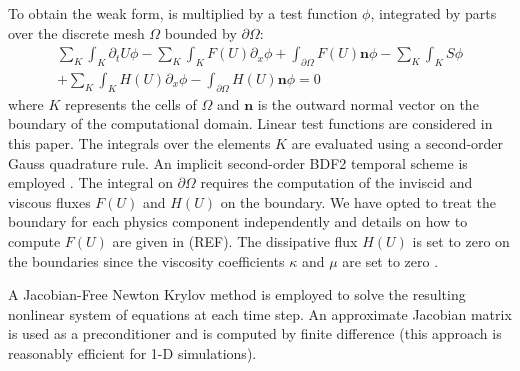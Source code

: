 \documentclass[times,doublespace]{fldauth}%
\begin{document}
%
To obtain the weak form,  is multiplied by a test function $\phi$, integrated by parts over the discrete mesh $\Omega$ bounded by $\partial \Omega$:
\begin{multline}
\sum_K \int_{K} \partial_t U \phi - \sum_K \int_{K} F(U) \partial_x \phi + \int_{\partial \Omega} F(U) \mathbf{n} \phi - 
 \sum_K \int_{K} S \phi \\
 + \sum_K \int_{K} H(U) \partial_x \phi - \int_{\partial \Omega}H \left( U \right) \mathbf{n} \phi= 0
\end{multline}
where $K$ represents the cells of $\Omega$ and $\mathbf{n}$ is the outward normal vector on the boundary of the computational domain. 
Linear test functions are considered in this paper. The integrals over the elements $K$ are evaluated using a second-order Gauss quadrature rule. 
An implicit second-order BDF2 temporal scheme is employed \cite{Leveque} . 
The integral on $\partial \Omega$ requires the computation of the inviscid and viscous fluxes $F(U)$ and $H(U)$ on the boundary. 
We have opted to treat the boundary for each physics component independently and details on how to compute $F(U)$ are given in (REF). 
The dissipative flux $H(U)$ is set to zero on the boundaries since the viscosity coefficients $\kappa$ and $\mu$ are set to zero \cite{jlg1, jlg2, valentin}. 

A Jacobian-Free Newton Krylov method \cite{JFNK} is employed to solve the resulting nonlinear system of equations at each time step.
An approximate Jacobian matrix is used as a preconditioner and is computed by finite difference (this approach is reasonably efficient for 1-D simulations). 

%
\end{document}

